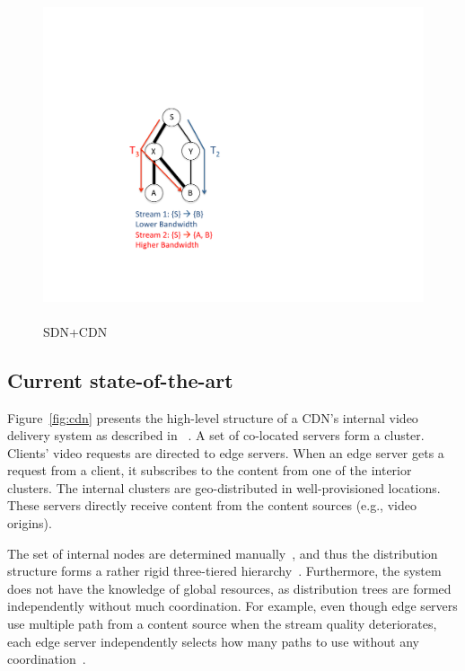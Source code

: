 \begin{figure}[t]
\begin{minipage}[b]{0.32\columnwidth}
  \centering
  \includegraphics[scale=.40]{figures/toy}
  \caption{\\SDN+CDN}
  \label{fig:toy}
\end{minipage}
\end{figure}

\subsection{Current state-of-the-art}

Figure~\ref{fig:cdn} presents the high-level structure of a CDN's internal
video delivery system as described in ~\cite{akamai-live}. A set of co-located
servers form a cluster.
Clients' video requests are directed to edge servers.  When an edge server gets
a request from a client, it subscribes to the content from one of the interior
clusters. The internal clusters are geo-distributed in well-provisioned
locations.  These servers directly receive content from the content sources (e.g., video origins).

The set of internal nodes are determined manually~\cite{akamai-live}, and thus
the distribution structure forms a rather rigid three-tiered hierarchy~\cite{spaa,akamai-live}.
Furthermore, the system does not have the knowledge of global resources, as distribution trees
are formed independently without much coordination.
For example, even though edge servers use multiple path from a content source
when the stream quality deteriorates, each edge server independently selects how many paths to use
without any coordination~\cite{akamai-live}.

